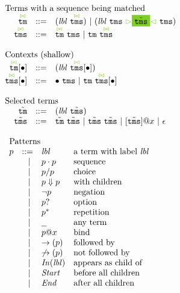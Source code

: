 \documentclass{article}
\makeatletter
\newcommand{\cursorColor}{LimeGreen}
\newcommand{\lbl}{\ensuremath{\mathit{lbl}}}
\newcommand{\tm}{\ensuremath{\mathtt{tm}}}
\newcommand{\tms}{\ensuremath{\mathtt{tms}}}
\newcommand{\Tmc}{\ensuremath{\overset{ \textcolor{\cursorColor}{\bowtie}}{\tm}}}
\newcommand{\Tmcs}{\ensuremath{\overset{\textcolor{\cursorColor}{\bowtie}}{\tms}}}
\newcommand{\Tmm}{\ensuremath{\tilde{\tm}}}
\newcommand{\Tmms}{\ensuremath{\tilde{\tms}}}
\newcommand{\mstart}{\ensuremath{\textcolor{\cursorColor}{\rhd}}}
\newcommand{\mend}{\ensuremath{\textcolor{\cursorColor}{\lhd}}}
\newcommand{\select}[1]{\mstart\colorbox{\cursorColor}{$#1$}\mend}
\newcommand{\pseq}[2]{\ensuremath{#1 \cdot #2}}
\newcommand{\por}[2]{\ensuremath{#1/#2}}
\newcommand{\children}[2]{\ensuremath{#1} \Downarrow #2}
\newcommand{\pnot}[1]{\ensuremath{\lnot #1}}
\newcommand{\maybe}[1]{\ensuremath{#1?}}
\newcommand{\many}[1]{\ensuremath{#1^*}}
\newcommand{\any}{\ensuremath{\text{\underline{\hspace{0.6em}}}}}
\newcommand{\bind}[2]{\ensuremath{#1@#2}}
\newcommand{\fb}[1]{\ensuremath{\rightarrow(#1)}}
\newcommand{\nfb}[1]{\ensuremath{\not\rightarrow(#1)}}
\newcommand{\pin}[1]{\ensuremath{\mathit{In}(#1)}}
\newcommand{\pstart}{\ensuremath{\mathit{Start}}}
\newcommand{\pend}{\ensuremath{\mathit{End}}}
\newcommand{\arrayheading}[2]{\multicolumn{#1}{l}{\mbox{#2}}}
\makeatother
\begin{document}
\[
  \begin{array}{rcl}
    \arrayheading{3}{Terms with a sequence being matched}\\
    \Tmc & ::= & (\lbl~\Tmcs) ~|~ (\lbl~\tms~\select{\Tmms}~\tms)\\
    \Tmcs & ::= & \Tmc ~ \tms ~|~ \tm ~ \Tmcs\\
    \\
    \arrayheading{3}{Contexts (shallow)}\\
    \Tmc[\bullet] & ::= & (\lbl~\Tmcs[\bullet])\\
    \Tmcs[\bullet] & ::= & \bullet ~ \tms ~|~ \tm ~ \Tmcs[\bullet]\\
    \\
    \arrayheading{3}{Selected terms}\\
    \Tmm & ::= & (\lbl~\Tmms)\\
    \Tmms & ::= & \Tmm~\Tmms ~|~ \Tmms~\Tmms ~|~ [\Tmms]@x ~|~ \epsilon\\
    \\
    \multicolumn{3}{l}{
    \begin{array}{crll}
      \arrayheading{4}{Patterns}\\
      p & ::= & \lbl & \text{a term with label $\lbl$}\\
        & ~|~ & \pseq{p}{p} & \text{sequence}\\
        & ~|~ & \por{p}{p} & \text{choice}\\
        & ~|~ & \children{p}{p} & \text{with children}\\
        & ~|~ & \pnot{p} & \text{negation}\\
        & ~|~ & \maybe{p} & \text{option}\\
        & ~|~ & \many{p} & \text{repetition}\\
        & ~|~ & \any{} & \text{any term}\\
        & ~|~ & \bind{p}{x} & \text{bind}\\
        & ~|~ & \fb{p} & \text{followed by}\\
        & ~|~ & \nfb{p} & \text{not followed by}\\
        & ~|~ & \pin{\lbl} & \text{appears as child of}\\
        & ~|~ & \pstart{} & \text{before all children}\\
        & ~|~ & \pend{} & \text{after all children}\\
    \end{array}
    }
  \end{array}
\]
\end{document}
